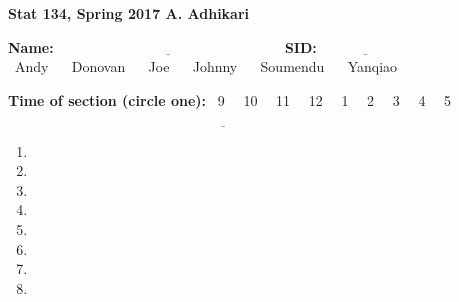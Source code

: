 \documentclass[11pt]{article}
\begin{document}
\noindent
{\bf Stat 134, Spring 2017  \hfill A. Adhikari\begin{center}{\large Quiz \end{center} }
\vspace*{.15in}
\noindent
{\bf {\Large Name}:$\ \underline{~~~~~~~~~~~~~~~~~~~~~~~~~~~~~~~~~~~~~~~~~~~~~~~~~~~~~~~~~~~~~~~~~~~~~~~~}$
{\Large SID}: $\underline{~~~~~~~~~~~~~~~~~~~~~~~~~~~~}$ }
\vspace{.1in}
\\ ~Andy ~~ Donovan ~~ Joe ~~ Johnny ~~ Soumendu ~~ Yanqiao

\vspace*{.1in}
\noindent
{\bf Time of section (circle one):} ~9 ~~10 ~~11 ~~12 ~~1 ~~2 ~~3 ~~4 ~~5

\noindent
$\underline{~~~~~~~~~~~~~~~~~~~~~~~~~~~~~~~~~~~~~~~~~~~~~~~~~~~~~~~~~~~~~~~
~~~~~~~~~~~~~~~~~~~~~~~~~~~~~~~~~~~~~~~~~~~~~~~~~~~~~~~~~~~~~~~~~~~~~~~~~~~~}$

\begin{enumerate}
	\item {}
\vfill
	\item {}
\vfill
\newpage
	\item {}
\vfill
	\item {}
\vfill
\newpage
	\item {}
\vfill
	\item {}
\vfill
\newpage
	\item {}
\vfill
	\item {}
\vfill
\end{enumerate}
\end{document}
